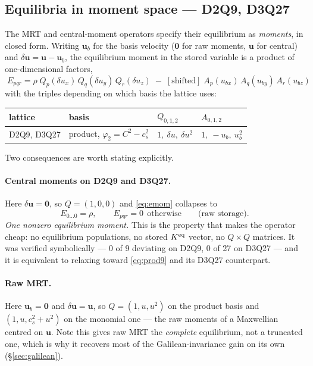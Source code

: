 \documentclass[11pt,a4paper]{article}
\newcommand{\cs}{c_s}
\newcommand{\uu}{\bm{u}}
\begin{document}
\subsection{Equilibria in moment space --- D2Q9, D3Q27}
\label{sec:eqmom}

The MRT and central-moment operators specify their equilibrium as \emph{moments},
in closed form. Writing $\uu_b$ for the basis velocity ($\bm0$ for raw moments,
$\uu$ for central) and $\delta\uu = \uu-\uu_b$, the equilibrium moment in the
stored variable is a product of one-dimensional factors,
\begin{equation}
  \boxed{\;
  E_{pqr} = \rho\;Q_p(\delta u_x)\,Q_q(\delta u_y)\,Q_r(\delta u_z)
   \;-\;[\text{shifted}]\;A_p(u_{bx})\,A_q(u_{by})\,A_r(u_{bz})\;}
  \label{eq:emom}
\end{equation}
with the triples depending on which basis the lattice uses:

\begin{center}\small
\begin{tabular}{llll}
\toprule
lattice & basis & $Q_{0,1,2}$ & $A_{0,1,2}$ \\
\midrule
D2Q9, D3Q27 & product, $\varphi_2=C^2-\cs^2$ &
  $1,\ \delta u,\ \delta u^2$ & $1,\ -u_b,\ u_b^2$ \\
\bottomrule
\end{tabular}
\end{center}

\noindent Two consequences are worth stating explicitly.

\paragraph{Central moments on D2Q9 and D3Q27.} Here $\delta\uu=\bm0$, so
$Q=(1,0,0)$ and \eqref{eq:emom} collapses to
\begin{equation}
  E_{0\ldots0} = \rho, \qquad E_{pqr} = 0 \ \ \text{otherwise}
  \qquad\text{(raw storage)} .
\end{equation}
\emph{One nonzero equilibrium moment.} This is the property that makes the
operator cheap: no equilibrium populations, no stored $K^{\rm eq}$ vector, no
$Q\times Q$ matrices. It was verified symbolically --- 0 of 9 deviating on D2Q9,
0 of 27 on D3Q27 --- and it is equivalent to relaxing toward \eqref{eq:prod9} and
its D3Q27 counterpart.

\paragraph{Raw MRT.} Here $\uu_b=\bm0$ and $\delta\uu=\uu$, so
$Q=(1,u,u^2)$ on the product basis and $(1,u,\cs^2+u^2)$ on the monomial one ---
the raw moments of a Maxwellian centred on $\uu$. Note this gives raw MRT the
\emph{complete} equilibrium, not a truncated one, which is why it recovers most
of the Galilean-invariance gain on its own (\S\ref{sec:galilean}).
\end{document}
